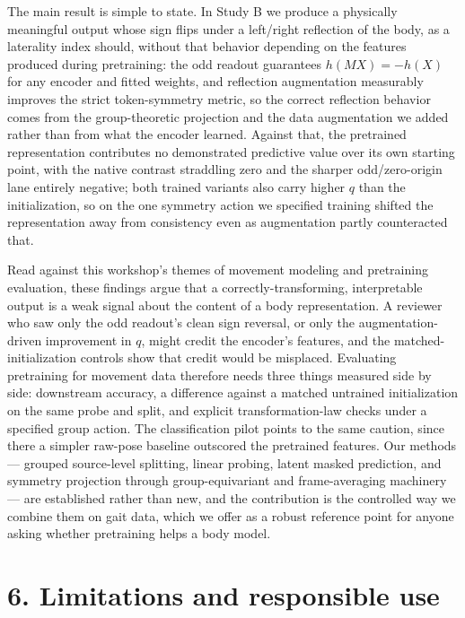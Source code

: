 \documentclass{article}
\begin{document}
The main result is simple to state. In Study B we produce a physically
meaningful output whose sign flips under a left/right reflection of the
body, as a laterality index should, without that behavior depending on
the features produced during pretraining: the odd readout guarantees
\(h(MX) = -h(X)\) for any encoder and fitted weights, and reflection
augmentation measurably improves the strict token-symmetry metric, so
the correct reflection behavior comes from the group-theoretic
projection and the data augmentation we added rather than from what the
encoder learned. Against that, the pretrained representation contributes
no demonstrated predictive value over its own starting point, with the
native contrast straddling zero and the sharper odd/zero-origin lane
entirely negative; both trained variants also carry higher \(q\) than
the initialization, so on the one symmetry action we specified training
shifted the representation away from consistency even as augmentation
partly counteracted that.

Read against this workshop's themes of movement modeling and pretraining
evaluation, these findings argue that a correctly-transforming,
interpretable output is a weak signal about the content of a body
representation. A reviewer who saw only the odd readout's clean sign
reversal, or only the augmentation-driven improvement in \(q\), might
credit the encoder's features, and the matched-initialization controls
show that credit would be misplaced. Evaluating pretraining for movement
data therefore needs three things measured side by side: downstream
accuracy, a difference against a matched untrained initialization on the
same probe and split, and explicit transformation-law checks under a
specified group action. The classification pilot points to the same
caution, since there a simpler raw-pose baseline outscored the
pretrained features. Our methods --- grouped source-level splitting,
linear probing, latent masked prediction, and symmetry projection
through group-equivariant and frame-averaging machinery --- are
established rather than new, and the contribution is the controlled way
we combine them on gait data, which we offer as a robust reference point
for anyone asking whether pretraining helps a body model.

\section{6. Limitations and responsible
use}\label{limitations-and-responsible-use}
\end{document}
